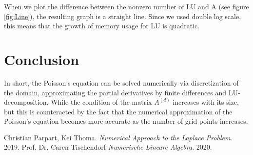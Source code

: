 \documentclass[refman]{article}
\theoremstyle{definition}
\begin{document}
When we plot the difference between the nonzero number of LU and A (see figure \ref{fig:Line}), the resulting graph is a straight line. Since we used double log scale, this means that the growth of memory usage for LU is quadratic.

\section{Conclusion}

In short, the Poisson's equation can be solved numerically via discretization of the domain, approximating the partial derivatives by finite differences and LU-decomposition. While the condition of the matrix \(A^{(d)}\) increases with its size, but this is counteracted by the fact that the numerical approximation of the Poisson's equation becomes more accurate as the number of grid points increases.

\begin{thebibliography}{9}
	Christian Parpart, Kei Thoma. 
	\textit{Numerical Approach to the Laplace Problem}. 
	2019.
	Prof. Dr. Caren Tischendorf
	\textit{Numerische Lineare Algebra}.
	2020.
\end{thebibliography}
\end{document}
